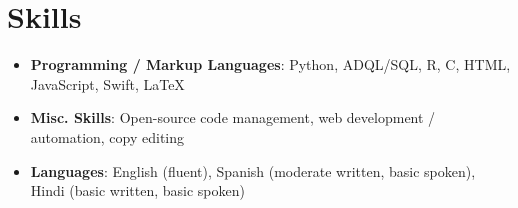 \documentclass[letterpaper,11pt]{article}
\newcommand{\resumeSubHeadingListStart}{\begin{itemize}[leftmargin=*]}
\newcommand{\resumeSubHeadingListEnd}{\end{itemize}}
\newcommand{\shorterSection}[1]{\vspace{-10pt}\section{#1}}
\newcommand{\shortershorterSection}[1]{\vspace{-10pt}\subsection{#1}}
\begin{document}
\shorterSection{Skills}
  \resumeSubHeadingListStart
  \small
    \item{
     \textbf{Programming / Markup Languages}{: Python, ADQL/SQL, R, C, HTML, JavaScript, Swift, \LaTeX}
    }
    \vspace{-5pt}
    \item{
     \textbf{Misc. Skills}{: Open-source code management, web development / automation, copy editing}
    }
    \vspace{-5pt}
    \item{
     \textbf{Languages}{: English (fluent), Spanish (moderate written, basic spoken), Hindi (basic written, basic spoken)}
    }
\resumeSubHeadingListEnd

%     
%     




  
  
\end{document}
